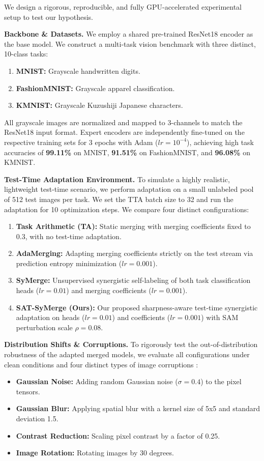 \documentclass{article}
\begin{document}
We design a rigorous, reproducible, and fully GPU-accelerated experimental setup to test our hypothesis.

\textbf{Backbone \& Datasets.}
We employ a shared pre-trained ResNet18 \cite{he2016deep} encoder as the base model. We construct a multi-task vision benchmark with three distinct, 10-class tasks:
\begin{enumerate}
    \item \textbf{MNIST:} Grayscale handwritten digits.
    \item \textbf{FashionMNIST:} Grayscale apparel classification.
    \item \textbf{KMNIST:} Grayscale Kuzushiji Japanese characters.
\end{enumerate}
All grayscale images are normalized and mapped to 3-channels to match the ResNet18 input format. Expert encoders are independently fine-tuned on the respective training sets for 3 epochs with Adam ($lr=10^{-4}$), achieving high task accuracies of \textbf{99.11\%} on MNIST, \textbf{91.51\%} on FashionMNIST, and \textbf{96.08\%} on KMNIST.

\textbf{Test-Time Adaptation Environment.}
To simulate a highly realistic, lightweight test-time scenario, we perform adaptation on a small unlabeled pool of 512 test images per task. We set the TTA batch size to 32 and run the adaptation for 10 optimization steps. We compare four distinct configurations:
\begin{enumerate}
    \item \textbf{Task Arithmetic (TA):} Static merging with merging coefficients fixed to 0.3, with no test-time adaptation.
    \item \textbf{AdaMerging:} Adapting merging coefficients strictly on the test stream via prediction entropy minimization ($lr=0.001$).
    \item \textbf{SyMerge:} Unsupervised synergistic self-labeling of both task classification heads ($lr=0.01$) and merging coefficients ($lr=0.001$).
    \item \textbf{SAT-SyMerge (Ours):} Our proposed sharpness-aware test-time synergistic adaptation on heads ($lr=0.01$) and coefficients ($lr=0.001$) with SAM perturbation scale $\rho = 0.08$.
\end{enumerate}

\textbf{Distribution Shifts \& Corruptions.}
To rigorously test the out-of-distribution robustness of the adapted merged models, we evaluate all configurations under clean conditions and four distinct types of image corruptions \cite{hendrycks2019benchmarking}:
\begin{itemize}
    \item \textbf{Gaussian Noise:} Adding random Gaussian noise ($\sigma = 0.4$) to the pixel tensors.
    \item \textbf{Gaussian Blur:} Applying spatial blur with a kernel size of 5x5 and standard deviation 1.5.
    \item \textbf{Contrast Reduction:} Scaling pixel contrast by a factor of 0.25.
    \item \textbf{Image Rotation:} Rotating images by 30 degrees.
\end{itemize}
\end{document}
